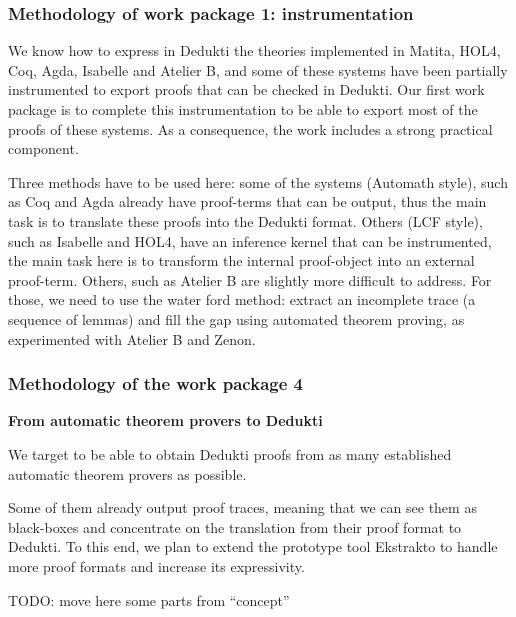 \subsubsection{Methodology of work package 1: instrumentation}

We know how to express in Dedukti the theories implemented in Matita,
HOL4, Coq, Agda, Isabelle and Atelier B, and some of these systems
have been partially instrumented to export proofs that can be checked
in Dedukti. Our first work package is to complete this instrumentation
to be able to export most of the proofs of these systems. As a
consequence, the work includes a strong practical component.

Three methods have to be used here: some of the systems (Automath
style), such as Coq and Agda already have proof-terms that can be
output, thus the main task is to translate these proofs into the
Dedukti format. Others (LCF style), such as Isabelle and HOL4, have an
inference kernel that can be instrumented, the main task here is to
transform the internal proof-object into an external
proof-term. Others, such as Atelier B are slightly more difficult to
address. For those, we need to use the water ford method: extract an
incomplete trace (a sequence of lemmas) and fill the gap using
automated theorem proving, as experimented with Atelier B and Zenon.


\subsubsection{Methodology of the work package 4}

{\bf \large From automatic theorem provers to Dedukti}

We target to be able to obtain Dedukti proofs from as many established
automatic theorem provers as possible.

Some of them already output proof traces, meaning that we can see them
as black-boxes and concentrate on the translation from their proof format
to Dedukti. To this end, we plan to extend the prototype tool Ekstrakto
to handle more proof formats and increase its expressivity.

TODO: move here some parts from ``concept''

